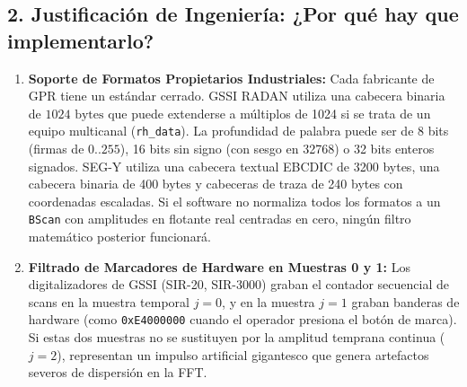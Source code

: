 \documentclass[11pt,a4paper]{article}
\begin{document}
\subsection{2. Justificación de Ingeniería: ¿Por qué hay que implementarlo?}
\begin{enumerate}
    \item \textbf{Soporte de Formatos Propietarios Industriales:}
    Cada fabricante de GPR tiene un estándar cerrado. GSSI RADAN utiliza una cabecera binaria de $1024\text{ bytes}$ que puede extenderse a múltiplos de 1024 si se trata de un equipo multicanal (\texttt{rh\_data}). La profundidad de palabra puede ser de 8 bits (firmas de $0..255$), 16 bits sin signo (con sesgo en 32768) o 32 bits enteros signados. SEG-Y utiliza una cabecera textual EBCDIC de 3200 bytes, una cabecera binaria de 400 bytes y cabeceras de traza de 240 bytes con coordenadas escaladas. Si el software no normaliza todos los formatos a un \texttt{BScan} con amplitudes en flotante real centradas en cero, ningún filtro matemático posterior funcionará.
    \item \textbf{Filtrado de Marcadores de Hardware en Muestras 0 y 1:}
    Los digitalizadores de GSSI (SIR-20, SIR-3000) graban el contador secuencial de scans en la muestra temporal $j=0$, y en la muestra $j=1$ graban banderas de hardware (como \texttt{0xE4000000} cuando el operador presiona el botón de marca). Si estas dos muestras no se sustituyen por la amplitud temprana continua ($j=2$), representan un impulso artificial gigantesco que genera artefactos severos de dispersión en la FFT.
\end{enumerate}
\end{document}
